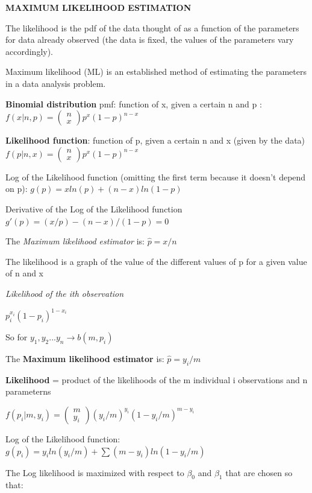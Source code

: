 \documentclass[
]{article}
\begin{document}
\textbf{MAXIMUM LIKELIHOOD ESTIMATION}

The likelihood is the pdf of the data thought of as a function of the
parameters for data already observed (the data is fixed, the values of
the parameters vary accordingly).

Maximum likelihood (ML) is an established method of estimating the
parameters in a data analysis problem.

\textbf{Binomial distribution} pmf: function of x, given a certain n and
p
:\(f ( x | n , p ) = \begin{pmatrix} n \\ x \end{pmatrix} p^x (1-p)^{n-x}\)

\textbf{Likelihood function}: function of p, given a certain n and x
(given by the data)
\(f ( p | n , x ) =\begin{pmatrix} n \\x \end{pmatrix} p^x (1-p)^{n-x}\)

Log of the Likelihood function (omitting the first term because it
doesn't depend on p): \(g(p)= x ln(p) + (n-x) ln(1-p)\)

Derivative of the Log of the Likelihood function
\(g'(p)= (x/p) - (n-x)/(1-p) = 0\)

The \emph{Maximum likelihood estimator} is: \(\hat{p} = x/n\)

The likelihood is a graph of the value of the different values of p for
a given value of n and x

\emph{Likelihood of the ith observation}

\(p_{i}^{x_{i}}(1-p_{i})^{1-x_{i}}\)

So for \(y_1, y_2 ... y_n \to b(m, p_i)\)

The \textbf{Maximum likelihood estimator} is: \(\hat{p} = y_i/m\)

\textbf{Likelihood} = product of the likelihoods of the m individual i
observations and n parameterns

\(f ( p_i | m , y_i ) = \begin{pmatrix} m \\ y_i \end{pmatrix} (y_i/m)^{y_i} (1-y_i/m)^{m-y_i}\)

Log of the Likelihood function:
\(g(p_i)= y_i ln(y_i/m) + \sum(m-y_i) ln(1-y_i/m)\)

The Log likelihood is maximized with respect to \(\beta_{0}\) and
\(\beta_{1}\) that are chosen so that:
\end{document}
